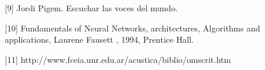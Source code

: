 [9] Jordi Pigem. Escuchar las voces del mundo.

[10] Fundamentals of Neural Networks, architectures, Algorithms and
applications, Laurene Fausett , 1994, Prentice Hall.\

[11] http://www.fceia.unr.edu.ar/acustica/biblio/omscrit.htm

\bigskip

\qquad

\qquad

\begin{center}
\bigskip
\end{center}


% 
